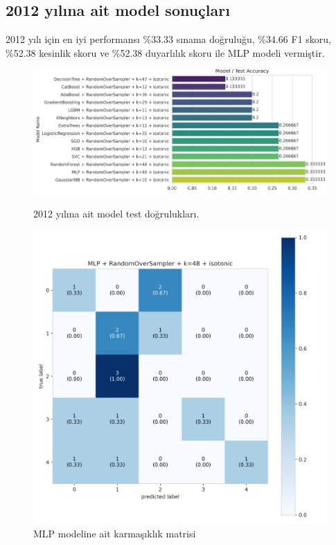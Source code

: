 \newpage

\subsection{2012 yılına ait model sonuçları}
2012 yılı için en iyi performansı \%33.33 sınama doğruluğu,  \%34.66 F1 skoru, \%52.38 kesinlik skoru ve \%52.38 duyarlılık skoru ile MLP modeli vermiştir.

\begin{figure}[ht]
\centering
\begin{minipage}[b]{0.6\textwidth}
    \centering
    \includegraphics[width=\textwidth]{2012.png}
    \caption{2012 yılına ait model test doğrulukları.}
    \label{fig:resim1}
\end{minipage}
\hfill
\begin{minipage}[b]{0.6\textwidth}
    \centering
    \includegraphics[width=\textwidth]{2012_cm.png}
    \caption{MLP modeline ait karmaşıklık matrisi}
    \label{fig:resim2}
\end{minipage}
\end{figure}

